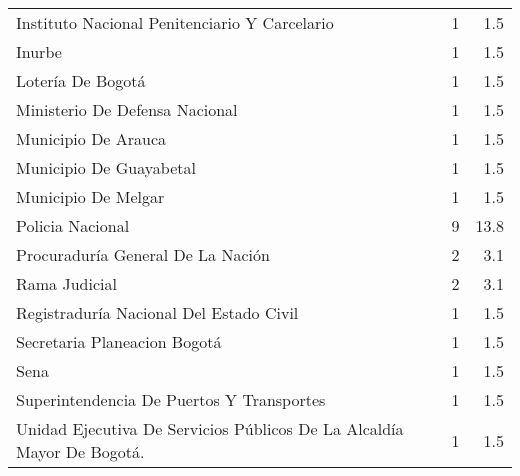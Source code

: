 \begin{table}[!htbp]
{\begin{tabular}{p{11cm}rr}
  Instituto Nacional Penitenciario Y Carcelario &  1 & 1.5 \\ 
  Inurbe &  1 & 1.5 \\ 
  Lotería De Bogotá &  1 & 1.5 \\ 
  Ministerio De Defensa Nacional &  1 & 1.5 \\ 
  Municipio De Arauca &  1 & 1.5 \\ 
  Municipio De Guayabetal &  1 & 1.5 \\ 
  Municipio De Melgar &  1 & 1.5 \\ 
  Policia Nacional &  9 & 13.8 \\ 
  Procuraduría General De La Nación &  2 & 3.1 \\ 
  Rama Judicial &  2 & 3.1 \\ 
  Registraduría Nacional Del Estado Civil &  1 & 1.5 \\ 
  Secretaria Planeacion Bogotá &  1 & 1.5 \\ 
  Sena &  1 & 1.5 \\ 
  Superintendencia De Puertos Y Transportes &  1 & 1.5 \\ 
  Unidad  Ejecutiva  De  Servicios  Públicos  De  La  Alcaldía  Mayor De Bogotá. &  1 & 1.5 \\ 
   \hline
\end{tabular}
}
\end{table}
